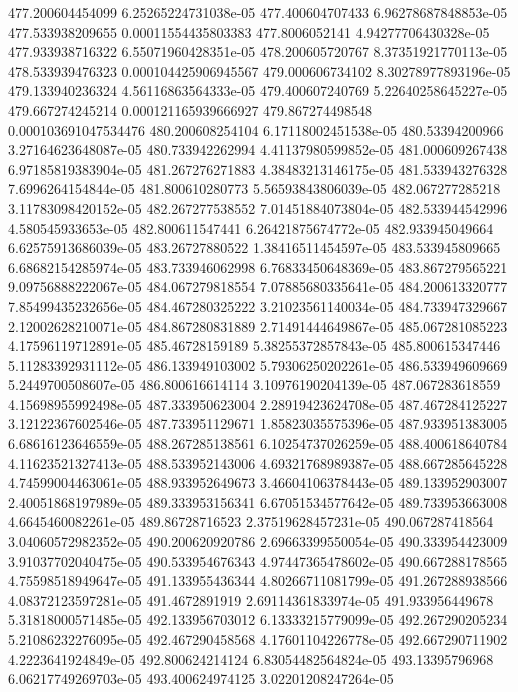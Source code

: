 {477.200604454099 6.25265224731038e-05
477.400604707433 6.96278687848853e-05
477.533938209655 0.00011554435803383
477.8006052141 4.94277706430328e-05
477.933938716322 6.55071960428351e-05
478.200605720767 8.37351921770113e-05
478.533939476323 0.000104425906945567
479.000606734102 8.30278977893196e-05
479.133940236324 4.56116863564333e-05
479.400607240769 5.22640258645227e-05
479.667274245214 0.000121165939666927
479.867274498548 0.000103691047534476
480.200608254104 6.17118002451538e-05
480.53394200966 3.27164623648087e-05
480.733942262994 4.41137980599852e-05
481.000609267438 6.97185819383904e-05
481.267276271883 4.38483213146175e-05
481.533943276328 7.6996264154844e-05
481.800610280773 5.56593843806039e-05
482.067277285218 3.11783098420152e-05
482.267277538552 7.01451884073804e-05
482.533944542996 4.580545933653e-05
482.800611547441 6.26421875674772e-05
482.933945049664 6.62575913686039e-05
483.26727880522 1.38416511454597e-05
483.533945809665 6.68682154285974e-05
483.733946062998 6.76833450648369e-05
483.867279565221 9.09756888222067e-05
484.067279818554 7.07885680335641e-05
484.200613320777 7.85499435232656e-05
484.467280325222 3.21023561140034e-05
484.733947329667 2.12002628210071e-05
484.867280831889 2.71491444649867e-05
485.067281085223 4.17596119712891e-05
485.46728159189 5.38255372857843e-05
485.800615347446 5.11283392931112e-05
486.133949103002 5.79306250202261e-05
486.533949609669 5.2449700508607e-05
486.800616614114 3.10976190204139e-05
487.067283618559 4.15698955992498e-05
487.333950623004 2.28919423624708e-05
487.467284125227 3.12122367602546e-05
487.733951129671 1.85823035575396e-05
487.933951383005 6.68616123646559e-05
488.267285138561 6.10254737026259e-05
488.400618640784 4.11623521327413e-05
488.533952143006 4.69321768989387e-05
488.667285645228 4.74599004463061e-05
488.933952649673 3.46604106378443e-05
489.133952903007 2.40051868197989e-05
489.333953156341 6.67051534577642e-05
489.733953663008 4.6645460082261e-05
489.86728716523 2.37519628457231e-05
490.067287418564 3.04060572982352e-05
490.200620920786 2.69663399550054e-05
490.333954423009 3.91037702040475e-05
490.533954676343 4.97447365478602e-05
490.667288178565 4.75598518949647e-05
491.133955436344 4.80266711081799e-05
491.267288938566 4.08372123597281e-05
491.4672891919 2.69114361833974e-05
491.933956449678 5.31818000571485e-05
492.133956703012 6.13333215779099e-05
492.267290205234 5.21086232276095e-05
492.467290458568 4.17601104226778e-05
492.667290711902 4.2223641924849e-05
492.800624214124 6.83054482564824e-05
493.13395796968 6.06217749269703e-05
493.400624974125 3.02201208247264e-05
}
